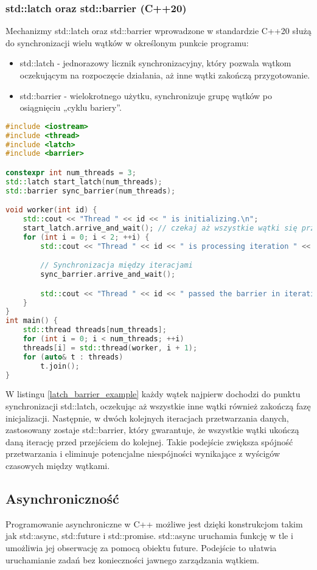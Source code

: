 \subsubsection{std::latch oraz std::barrier (C++20)}
Mechanizmy std::latch oraz std::barrier wprowadzone w standardzie C++20 służą do synchronizacji wielu wątków w określonym punkcie programu:
\begin{itemize}
    \item std::latch - jednorazowy licznik synchronizacyjny, który pozwala wątkom oczekującym na rozpoczęcie działania, aż inne wątki zakończą przygotowanie.
    \item std::barrier - wielokrotnego użytku, synchronizuje grupę wątków po osiągnięciu „cyklu bariery”.
\end{itemize}
\begin{lstlisting}[language=C++, caption={Przykład użycia std::latch oraz std::barrier}, label={latch_barrier_example}]
#include <iostream>
#include <thread>
#include <latch>
#include <barrier>

constexpr int num_threads = 3;
std::latch start_latch(num_threads);
std::barrier sync_barrier(num_threads);

void worker(int id) {
    std::cout << "Thread " << id << " is initializing.\n";
    start_latch.arrive_and_wait(); // czekaj aż wszystkie wątki się przygotują
    for (int i = 0; i < 2; ++i) {
        std::cout << "Thread " << id << " is processing iteration " << i << ".\n";

        // Synchronizacja między iteracjami
        sync_barrier.arrive_and_wait();

        std::cout << "Thread " << id << " passed the barrier in iteration " << i << ".\n";
    }
}
int main() {
    std::thread threads[num_threads];
    for (int i = 0; i < num_threads; ++i)
    threads[i] = std::thread(worker, i + 1);
    for (auto& t : threads)
        t.join();
}
\end{lstlisting}    
W listingu \ref{latch_barrier_example} każdy wątek najpierw dochodzi do punktu synchronizacji std::latch, oczekując aż wszystkie inne wątki również zakończą fazę inicjalizacji. Następnie, w dwóch kolejnych iteracjach przetwarzania danych, zastosowany zostaje std::barrier, który gwarantuje, że wszystkie wątki ukończą daną iterację przed przejściem do kolejnej. Takie podejście zwiększa spójność przetwarzania i eliminuje potencjalne niespójności wynikające z wyścigów czasowych między wątkami.

\subsection{Asynchroniczność}
Programowanie asynchroniczne w C++ możliwe jest dzięki konstrukcjom takim jak std::async, std::future i std::promise. std::async uruchamia funkcję w tle i umożliwia jej obserwację za pomocą obiektu future. Podejście to ułatwia uruchamianie zadań bez konieczności jawnego zarządzania wątkiem.

